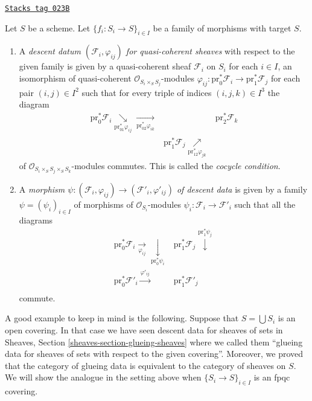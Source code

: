 \begin{definition}
\label{descent-definition-descent-datum-quasi-coherent}
\href{https://stacks.math.columbia.edu/tag/023B}{\texttt{Stacks tag 023B}}

Let $S$ be a scheme. Let $\{f_i : S_i \to S\}_{i \in I}$ be a family
of morphisms with target $S$.
\begin{enumerate}
\item A {\it descent datum $(\mathcal{F}_i, \varphi_{ij})$
for quasi-coherent sheaves} with respect to the given family
is given by a quasi-coherent sheaf $\mathcal{F}_i$ on $S_i$ for
each $i \in I$, an isomorphism of quasi-coherent
$\mathcal{O}_{S_i \times_S S_j}$-modules
$\varphi_{ij} : \text{pr}_0^*\mathcal{F}_i \to \text{pr}_1^*\mathcal{F}_j$
for each pair $(i, j) \in I^2$
such that for every triple of indices $(i, j, k) \in I^3$ the
diagram
$$
\begin{array}{ccc}\text{pr}_0^*\mathcal{F}_i \underset{\text{pr}_{01}^*\varphi_{ij}}{\searrow}\underset{\text{pr}_{02}^*\varphi_{ik}}{\longrightarrow} &  & \text{pr}_2^*\mathcal{F}_k \\  & \text{pr}_1^*\mathcal{F}_j \underset{\text{pr}_{12}^*\varphi_{jk}}{\nearrow} & \end{array}
$$
of $\mathcal{O}_{S_i \times_S S_j \times_S S_k}$-modules
commutes. This is called the {\it cocycle condition}.
\item A {\it morphism $\psi : (\mathcal{F}_i, \varphi_{ij}) \to
(\mathcal{F}'_i, \varphi'_{ij})$ of descent data} is given
by a family $\psi = (\psi_i)_{i\in I}$ of morphisms of
$\mathcal{O}_{S_i}$-modules $\psi_i : \mathcal{F}_i \to \mathcal{F}'_i$
such that all the diagrams
$$
\begin{array}{cc}\text{pr}_0^*\mathcal{F}_i \underset{\varphi_{ij}}{\longrightarrow}\underset{\text{pr}_0^*\psi_i}{\downarrow} & \text{pr}_1^*\mathcal{F}_j \overset{\text{pr}_1^*\psi_j}{\downarrow} \\ \text{pr}_0^*\mathcal{F}'_i \overset{\varphi'_{ij}}{\longrightarrow} & \text{pr}_1^*\mathcal{F}'_j \\  & \end{array}
$$
commute.
\end{enumerate}
\end{definition}

A good example to keep in mind is the following.
Suppose that $S = \bigcup S_i$ is an open covering.
In that case we have seen descent data for sheaves of sets in
Sheaves, Section \ref{sheaves-section-glueing-sheaves}
where we called them ``glueing data for sheaves of sets
with respect to the given covering''. Moreover, we proved
that the category of glueing data is equivalent to the category
of sheaves on $S$. We will show the analogue in the setting above when
$\{S_i \to S\}_{i\in I}$ is an fpqc covering.

